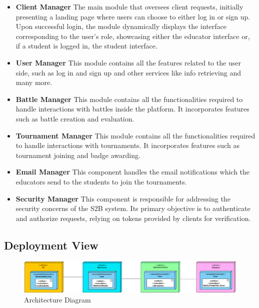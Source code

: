 \documentclass[12pt,oneside,a4paper]{article}
\begin{document}
\begin{itemize}
    \item \textbf{Client Manager} The main module that oversees client requests, initially presenting a landing page where users can choose to either log in or sign up. Upon successful login, the module dynamically displays the interface corresponding to the user's role, showcasing either the educator interface or, if a student is logged in, the student interface.

    \item \textbf{User Manager} This module contains all the features related to the user side, such as log in and sign up and other services like info retrieving and many more.
    
    \item \textbf{Battle Manager} This module contains all the functionalities required to handle interactions with battles inside the platform. It incorporates features such as battle creation and evaluation.

    \item \textbf{Tournament Manager} This module contains all the functionalities required to handle interactions with tournaments. It incorporates features such as tournament joining and badge awarding.

    \item \textbf{Email Manager} This component handles the email notifications which the educators send to the students to join the tournaments.

    \item \textbf{Security Manager} This component is responsible for addressing the security concerns of the S2B system. Its primary objective is to authenticate and authorize requests, relying on tokens provided by clients for verification.
    
\end{itemize}

\clearpage

\subsection{Deployment View}

\begin{figure}[htbp]
    \centering
    \includegraphics[width=1\linewidth]{Images/Diagrams/Architecture.png}
    \caption{Architecture Diagram}
    \label{fig:enter-label}
\end{figure}
\end{document}
